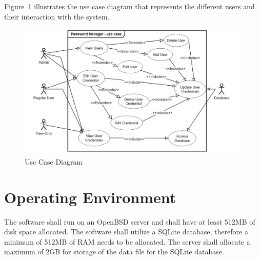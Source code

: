 \documentclass[letterpaper,12pt,oneside,listof=totoc]{scrreprt}
\begin{document}
Figure~\ref{Use Case} illustrates the use case diagram that represents the different users and their interaction with the system.

\begin{figure}
\centering
\includegraphics[width=\linewidth]{UseCaseDiagramUpdate.png}
\caption{Use Case Diagram}
\label{Use Case}
\end{figure}

\section{Operating Environment}

The software shall run on an OpenBSD server and shall have at least 512MB of disk space allocated. The software shall utilize a SQLite database, therefore a minimum of 512MB of RAM needs to be allocated. The server shall allocate a maximum of 2GB for storage of the data file for the SQLite database.

\end{document}
